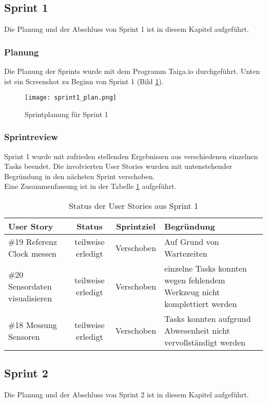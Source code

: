 \subsection*{Sprint 1}
Die Planung und der Abschluss von Sprint 1 ist in diesem Kapitel aufgeführt.
\subsubsection*{Planung}
Die Planung der Sprints wurde mit dem Programm Taiga.io durchgeführt. Unten ist ein Screenshot zu Beginn von Sprint 1 (Bild \ref{fig:sprint1}).
    \begin{figure}[H]
        \centering
        \texttt{[image: sprint1\_plan.png]}
        \caption{Sprintplanung für Sprint 1}
        \label{fig:sprint1}
    \end{figure}
\subsubsection*{Sprintreview}
    Sprint 1 wurde mit zufrieden stellenden Ergebnissen aus verschiedenen einzelnen Tasks beendet. Die involvierten User Stories wurden mit untenstehender Begründung in den nächsten Sprint verschoben.\\
    Eine Zusammenfassung ist in der Tabelle \ref{tab:sprint1} aufgeführt.
    \begin{table}[H]
        \centering
        \begin{tabular}{lccp{7cm}}
            \textbf{User Story} &  \textbf{Status} & \textbf{Sprintziel}& \textbf{Begründung}\\\toprule[2pt]
            \#19 Referenz Clock messen & teilweise erledigt & Verschoben & Auf Grund von Wartezeiten\\
            \#20 Sensordaten visualisieren & teilweise erledigt & Verschoben & einzelne Tasks konnten wegen fehlendem Werkzeug nicht komplettiert werden\\
            \#18 Messung Sensoren & teilweise erledigt & Verschoben & Tasks konnten aufgrund Abwesenheit nicht vervollständigt werden\\
        \end{tabular}
        \caption{Status der User Stories aus Sprint 1}
        \label{tab:sprint1}
    \end{table}

\clearpage
\subsection*{Sprint 2}
Die Planung und der Abschluss von Sprint 2 ist in diesem Kapitel aufgeführt.
